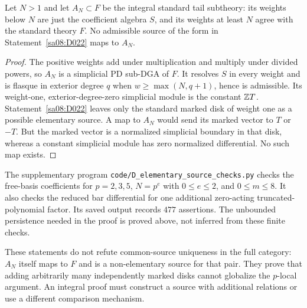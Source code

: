 \begin{corollary}
\label{sa08:D023}
Let $N>1$ and let $A_N\subset F$ be the integral standard tail
subtheory: its weights below $N$ are just the coefficient algebra
$S$, and its weights at least $N$ agree with the standard theory
$F$. No admissible source of the form in
Statement~\ref{sa08:D022} maps to $A_N$.
\end{corollary}
\begin{proof}
The positive weights add under multiplication and multiply under
divided powers, so $A_N$ is a simplicial PD sub-DGA of $F$. It
resolves $S$ in every weight and is flasque in exterior degree $q$
when $w\ge\max(N,q+1)$, hence is admissible. Its weight-one,
exterior-degree-zero simplicial module is the constant $\mathbb Z T$.
Statement~\ref{sa08:D022} leaves only the standard marked disk of
weight one as a possible elementary source. A map to $A_N$ would
send its marked vector to $T$ or $-T$. But the marked vector is a
normalized simplicial boundary in that disk, whereas a constant
simplicial module has zero normalized differential. No such map
exists.
\end{proof}

The supplementary program
\texttt{code/D\_elementary\_source\_checks.py} checks the free-basis
coefficients for $p=2,3,5$, $N=p^e$ with $0\le e\le2$, and
$0\le m\le8$. It also checks the reduced bar differential for one
additional zero-acting truncated-polynomial factor. Its saved output
records $477$ assertions. The unbounded persistence needed in the
proof is proved above, not inferred from these finite checks.

These statements do not refute common-source uniqueness in the
full category: $A_N$ itself maps to $F$ and is a non-elementary
source for that pair. They prove that adding arbitrarily many
independently marked disks cannot globalize the $p$-local argument.
An integral proof must construct a source with additional
relations or use a different comparison mechanism.
